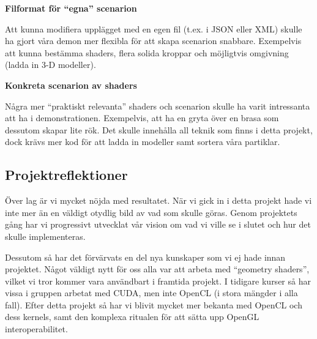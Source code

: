 \documentclass[a4paper]{article}
\begin{document}
\begin{multicols}{2}
            \textbf{Filformat för ``egna'' scenarion}

            Att kunna modifiera upplägget med en egen fil (t.ex. i JSON eller XML) skulle ha gjort våra demon mer flexibla för att skapa scenarion snabbare. Exempelvis att kunna bestämma shaders, flera solida kroppar och möjligtvis omgivning (ladda in 3-D modeller).

            \textbf{Konkreta scenarion av shaders}

            Några mer ``praktiskt relevanta'' shaders och scenarion skulle ha varit intressanta att ha i demonstrationen. Exempelvis, att ha en gryta över en brasa som dessutom skapar lite rök. Det skulle innehålla all teknik som finns i detta projekt, dock krävs mer kod för att ladda in modeller samt sortera våra partiklar.

        \subsection{Projektreflektioner}

            Över lag är vi mycket nöjda med resultatet. När vi gick in i detta projekt hade vi inte mer än en väldigt otydlig bild av vad som skulle göras. Genom projektets gång har vi progressivt utvecklat vår vision om vad vi ville se i slutet och hur det skulle implementeras.

            Dessutom så har det förvärvats en del nya kunskaper som vi ej hade innan projektet. Något väldigt nytt för oss alla var att arbeta med ``geometry shaders'', vilket vi tror kommer vara användbart i framtida projekt. I tidigare kurser så har vissa i gruppen arbetat med CUDA, men inte OpenCL (i stora mängder i alla fall). Efter detta projekt så har vi blivit mycket mer bekanta med OpenCL och dess kernels, samt den komplexa ritualen för att sätta upp OpenGL interoperabilitet.

    \nocite{*} %
    
    
\end{multicols}
\end{document}

